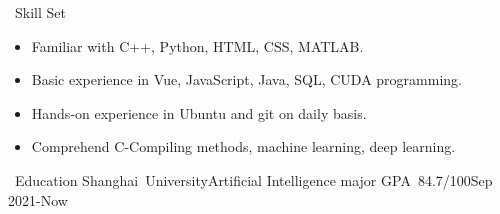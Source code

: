 \documentclass[UTF8]{resume}
\begin{document}
  
\begin{rSection}{\faCogs~Skill Set}
    \begin{itemize}
        \itemsep -0.5em
        \item Familiar with C++, Python, HTML, CSS, MATLAB.
        \item Basic experience in Vue, JavaScript, Java, SQL, CUDA programming.
        \item Hands-on experience in Ubuntu and git on daily basis.
        \item Comprehend C-Compiling methods, machine learning, deep learning.
    \end{itemize} 
\end{rSection}

\begin{rSection}{\faGraduationCap~Education}
    Shanghai~University\quad Artificial Intelligence major \quad GPA~84.7/100\hfill Sep 2021-Now\\
\end{rSection}
 
\end{document}

